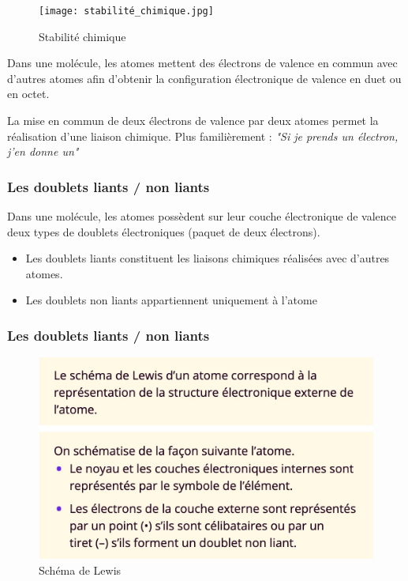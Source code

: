 \documentclass{article}
\begin{document}
\begin{figure}[H]
  \centering
  \texttt{[image: stabilité\_chimique.jpg]}
  \caption{\label{} Stabilité chimique}
\end{figure}



\begin{tcolorbox}[colback=green!10!white, colframe=green!75!black, title=Définitions : ]
  Dans une molécule, les atomes mettent des électrons de valence en commun avec d’autres atomes afin d’obtenir la configuration électronique de valence en duet ou en octet. \par
  \vspace{1em}
  La mise en commun de deux électrons de valence par deux atomes permet la réalisation d’une liaison chimique.
  \vspace{1em}
  Plus familièrement : \textit{"Si je prends un électron, j'en donne un"}
\end{tcolorbox}

\subsubsection{Les doublets liants / non liants}

Dans une molécule, les atomes possèdent sur leur couche électronique de valence deux types de doublets électroniques (paquet de deux électrons).
\begin{itemize}[noitemsep]
  \item Les doublets liants constituent les liaisons chimiques réalisées avec d’autres atomes.
  \item Les doublets non liants appartiennent uniquement à l’atome
\end{itemize}

\subsubsection{Les doublets liants / non liants}

\begin{figure}[H]
  \centering
  \includegraphics[width=0.6\linewidth]{lewis.jpg}
  \caption{\label{} Schéma de Lewis}
\end{figure}
\end{document}

